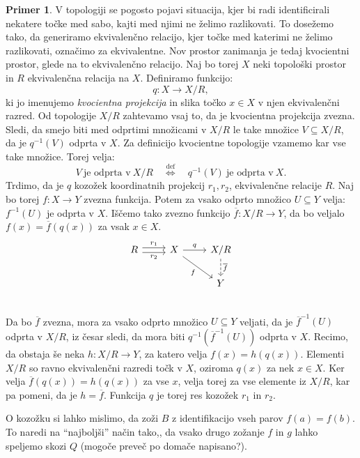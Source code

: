 \documentclass[12pt,a4paper]{book}
\theoremstyle{definition}
\theoremstyle{plain}
\theoremstyle{definition}
\newtheorem{primer}{Primer}[section]
\theoremstyle{remark}
\begin{document}
\begin{primer}
V topologiji se pogosto pojavi situacija, kjer bi radi identificirali nekatere točke med sabo, kajti med njimi ne želimo razlikovati. To dosežemo tako, da generiramo ekvivalenčno relacijo, kjer točke med katerimi ne želimo razlikovati, označimo za ekvivalentne. Nov prostor zanimanja je tedaj kvocientni prostor, glede na to ekvivalenčno relacijo.  Naj bo torej $X$ neki topološki prostor in $R$ ekvivalenčna relacija na $X$. Definiramo funkcijo:
$$ q : X \to X/R,$$
ki jo imenujemo \emph{kvocientna projekcija} in slika točko $x \in X$ v njen ekvivalenčni razred. Od topologije $X/R$ zahtevamo vsaj to, da je kvocientna projekcija zvezna. Sledi, da smejo biti med odprtimi množicami v $X/R$ le take množice $V \subseteq X/R$, da je $q^{-1}(V)$ odprta v $X$. Za definicijo kvocientne topologije vzamemo kar vse take množice. Torej velja:
$$V \ \text{je odprta v} \ X/R \quad \overset{\text{def}}{\Leftrightarrow} \quad q^{-1}(V) \ \text{je odprta v} \ X.$$
Trdimo, da je $q$ kozožek koordinatnih projekcij $r_1,r_2$, ekvivalenčne relacije $R$.
Naj bo torej $f : X \to Y$ zvezna funkcija. Potem za vsako odprto množico $U \subseteq Y$ velja: $f^{-1}(U)$ je odprta v $X$. Iščemo tako zvezno funkcijo $\overline{f} : X/R \to Y$, da bo veljalo $f(x) = \overline{f}(q(x))$ za vsak $x \in X$.
$$\begin{tikzcd}
R \ar[r, shift left, "r_1"] \ar[r, shift right, "r_2"'] & X \ar[r, "q"] \ar[dr, "f"'] & X/R \ar[d, dashed, "\overline{f}"] \\
& & Y \\
\end{tikzcd}$$
Da bo $\overline{f}$ zvezna, mora za vsako odprto množico $U \subseteq Y$ veljati, da je $\overline{f}^{-1}(U)$ odprta v $X/R$, iz česar sledi, da mora biti $q^{-1}(\overline{f}^{-1}(U))$ odprta v $X$. Recimo, da obstaja še neka $h : X/R \to Y$, za katero velja $f(x) = h(q(x))$. Elementi $X/R$ so ravno ekvivalenčni razredi točk v $X$, oziroma $q(x)$ za nek $x \in X$. Ker velja $\overline{f}(q(x)) = h(q(x))$ za vse $x$, velja torej za vse elemente iz $X/R$, kar pa pomeni, da je $h = \overline{f}$. Funkcija $q$ je torej res kozožek $r_1$ in $r_2$.

\end{primer}

O kozožku si lahko mislimo, da zoži $B$ z identifikacijo vseh parov $f(a) = f(b)$. To naredi na "`najboljši"' način tako,, da vsako drugo zožanje $f$ in $g$ lahko speljemo skozi $Q$ (mogoče preveč po domače napisano?).
\end{document}
